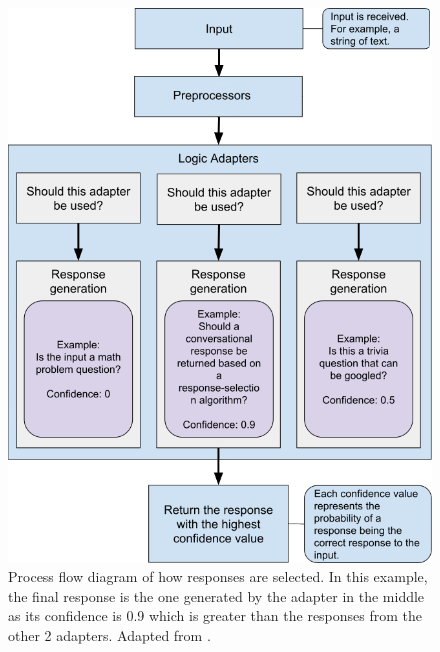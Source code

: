 \documentclass[12pt,a4paper]{article}
\newcommand{\captionstyle}[1] {
    \small{#1}
}
\begin{document}
\begin{figure}[!hb]%
    \centering
    \includegraphics[width=0.9\columnwidth]{dialog-processing-flow}%
    \caption[Process flow diagram of how responses are selected]{\captionstyle{Process flow diagram of how responses are selected. In this example, the final response is the one generated by the adapter in the middle as its confidence is 0.9 which is greater than the responses from the other 2 adapters. Adapted from \citep{Chatterbot:online}.}}%
    \label{fig:dialog-processing-flow}%
\end{figure}
\end{document}
